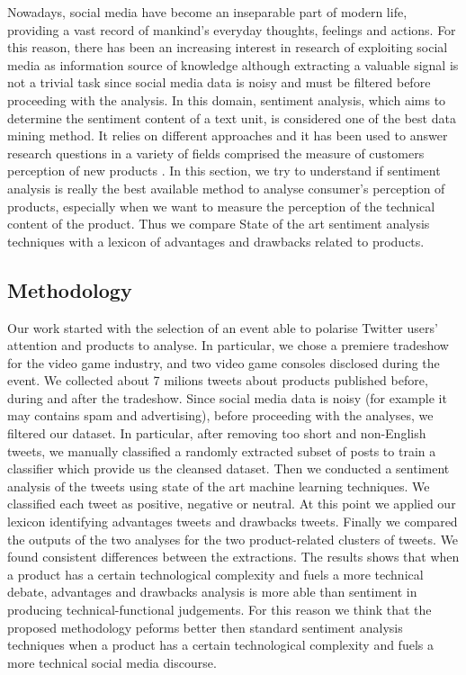 \documentclass[]{book}
\theoremstyle{definition}
\theoremstyle{definition}
\theoremstyle{definition}
\theoremstyle{remark}
\begin{document}
Nowadays, social media have become an inseparable part of modern life,
providing a vast record of mankind's everyday thoughts, feelings and
actions. For this reason, there has been an increasing interest in
research of exploiting social media as information source of knowledge
although extracting a valuable signal is not a trivial task since social
media data is noisy and must be filtered before proceeding with the
analysis. In this domain, sentiment analysis, which aims to determine
the sentiment content of a text unit, is considered one of the best data
mining method. It relies on different approaches
\citep{collomb2014study} and it has been used to answer research
questions in a variety of fields comprised the measure of customers
perception of new products \citep{mirtalaie2018extracting}. In this
section, we try to understand if sentiment analysis is really the best
available method to analyse consumer's perception of products,
especially when we want to measure the perception of the technical
content of the product. Thus we compare State of the art sentiment
analysis techniques with a lexicon of advantages and drawbacks related
to products.

\subsection{Methodology}\label{methodology-8}

Our work started with the selection of an event able to polarise Twitter
users' attention and products to analyse. In particular, we chose a
premiere tradeshow for the video game industry, and two video game
consoles disclosed during the event. We collected about 7 milions tweets
about products published before, during and after the tradeshow. Since
social media data is noisy (for example it may contains spam and
advertising), before proceeding with the analyses, we filtered our
dataset. In particular, after removing too short and non-English tweets,
we manually classified a randomly extracted subset of posts to train a
classifier which provide us the cleansed dataset. Then we conducted a
sentiment analysis of the tweets using state of the art machine learning
techniques. We classified each tweet as positive, negative or neutral.
At this point we applied our lexicon identifying advantages tweets and
drawbacks tweets. Finally we compared the outputs of the two analyses
for the two product-related clusters of tweets. We found consistent
differences between the extractions. The results shows that when a
product has a certain technological complexity and fuels a more
technical debate, advantages and drawbacks analysis is more able than
sentiment in producing technical-functional judgements. For this reason
we think that the proposed methodology peforms better then standard
sentiment analysis techniques when a product has a certain technological
complexity and fuels a more technical social media discourse.
\end{document}
